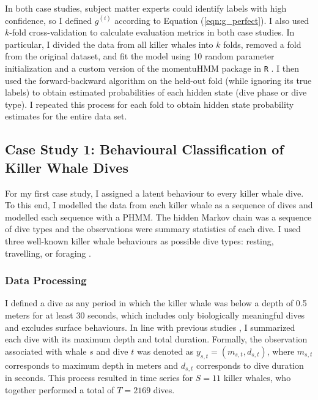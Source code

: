 In both case studies, subject matter experts could identify labels with high confidence, so I defined $g^{(i)}$ according to Equation (\ref{eqn:g_perfect}). I also used $k$-fold cross-validation to calculate evaluation metrics in both case studies. In particular, I divided the data from all killer whales into $k$ folds, removed a fold from the original dataset, and fit the model using 10 random parameter initialization and a custom version of the momentuHMM package in \texttt{R} \citep{McClintock:2018, R:2023}. I then used the forward-backward algorithm on the held-out fold (while ignoring its true labels) to obtain estimated probabilities of each hidden state (dive phase or dive type). I repeated this process for each fold to obtain hidden state probability estimates for the entire data set.

\subsection{Case Study 1: Behavioural Classification of Killer Whale Dives}

For my first case study, I assigned a latent behaviour to every killer whale dive. To this end, I modelled the data from each killer whale as a sequence of dives and modelled each sequence with a PHMM. %
The hidden Markov chain was a sequence of dive types and the observations were summary statistics of each dive. I used three well-known killer whale behaviours as possible dive types: resting, travelling, or foraging \citep{McRae:2024}. 

\subsubsection{Data Processing}

I defined a dive as any period in which the killer whale was below a depth of 0.5 meters for at least 30 seconds, which includes only biologically meaningful dives and excludes surface behaviours. In line with previous studies \citep{Barajas:2017, McRae:2024}, I summarized each dive with its maximum depth and total duration.  Formally, the observation associated with whale $s$ and dive $t$ was denoted as $y_{s,t} = (m_{s,t},d_{s,t})$, where $m_{s,t}$ corresponds to maximum depth in meters and $d_{s,t}$ corresponds to dive duration in seconds. This process resulted in time series for $S=11$ killer whales, who together performed a total of $T=2169$ dives.


